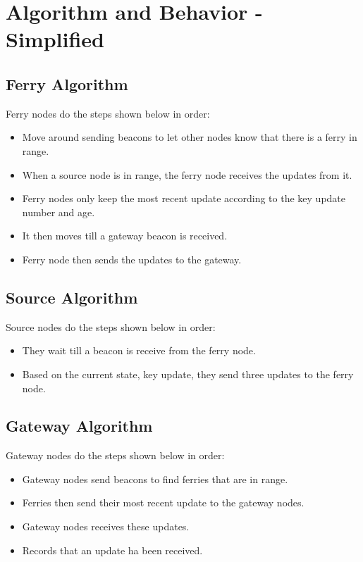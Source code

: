 \section{Algorithm and Behavior - Simplified}

\subsection{Ferry Algorithm}

Ferry nodes do the steps shown below in order:

\begin{itemize}
\item Move around sending beacons to let other nodes know that there is a ferry in range.
\item When a source node is in range, the ferry node receives the updates from it.
\item Ferry nodes only keep the most recent update according to the key update number and age.
\item It then moves till a gateway beacon is received.
\item Ferry node then sends the updates to the gateway.
\end{itemize}

\subsection{Source Algorithm}

Source nodes do the steps shown below in order:

\begin{itemize}
\item They wait till a beacon is receive from the ferry node.
\item Based on the current state, key update,  they send three updates to the ferry node.


\end{itemize}


\subsection{Gateway Algorithm}

Gateway nodes do the steps shown below in order:

\begin{itemize}
\item Gateway nodes send beacons to find ferries that are in range.
\item Ferries then send their most recent update to the gateway nodes.
\item Gateway nodes receives these updates.
\item Records that an update ha been received.
\end{itemize}



